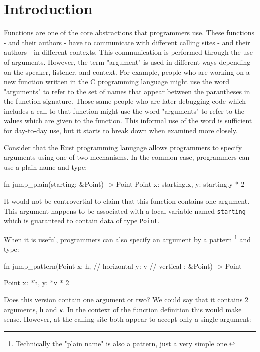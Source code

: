 \section{Introduction}

Functions are one of the core abstractions that programmers use.
These functions - and their authors - have to communicate with different calling sites -
and their authors - in different contexts.
This communication is performed through the use of arguments.
However, the term "argument" is used in different ways depending on the speaker, listener,
and context.
For example, people who are working on a new function written in the C programming
language might use the word "arguments" to refer to the set of names that appear between
the parantheses in the function signature.
Those same people who are later debugging code which includes a call to that function
might use the word "arguments" to refer to the values which are given to the function.
This informal use of the word is sufficient for day-to-day use, but it starts to break
down when examined more closely.

Consider that the Rust programming lanugage allows programmers to specify arguments using
one of two mechanisms.
In the common case, programmers can use a plain name and type:

\begin{pygmented}[lang=rust]
fn jump_plain(starting: &Point) -> Point {
  Point {
    x: starting.x,
    y: starting.y * 2
  }
}
\end{pygmented}

It would not be controvertial to claim that this function contains one argument.
This argument happens to be associated with a local variable named \texttt{starting} which
is guaranteed to contain data of type \texttt{Point}.

When it is useful, programmers can also specify an argument by a pattern
\footnote{Technically the "plain name" is also a pattern, just a very simple one.}
and type:

\begin{pygmented}[lang=rust]
fn jump_pattern(Point {
                  x: h, // horizontal
                  y: v  // vertical
                }: &Point)
  -> Point {

  Point {
    x: *h,
    y: *v * 2
  }
}
\end{pygmented}

Does this version contain one argument or two?
We could say that it contains 2 arguments, \texttt{h} and \texttt{v}.
In the context of the function definition this would make sense.
However, at the calling site both appear to accept only a single argument:

